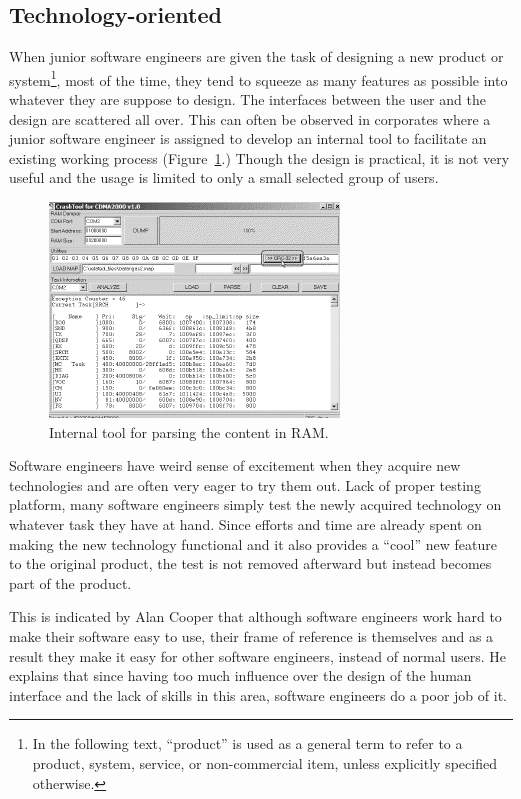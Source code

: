 \documentclass{acm_proc_article-sp}
\begin{document}
\subsection{Technology-oriented}
When junior software engineers are given the task of designing a new
product or system\footnote{In the following text, ``product'' is used
  as a general term to refer to a product, system, service, or
  non-commercial item, unless explicitly specified otherwise.}, most
of the time, they tend to squeeze as many features as possible into
whatever they are suppose to design. The interfaces between the user
and the design are scattered all over. This can often be observed in
corporates where a junior software engineer is assigned to develop an
internal tool to facilitate an existing working process
(Figure~\ref{fig:featureful}.)  Though the design is practical, it is
not very useful and the usage is limited to only a small selected
group of users.

\begin{figure}[!t]
\centering
\includegraphics[width=.7\columnwidth]{featureful}
\caption{Internal tool for parsing the content in RAM.}
\label{fig:featureful}
\end{figure}

Software engineers have weird sense of excitement when they acquire
new technologies and are often very eager to try them out. Lack of
proper testing platform, many software engineers simply test the newly
acquired technology on whatever task they have at hand. Since efforts
and time are already spent on making the new technology functional and
it also provides a ``cool'' new feature to the original product, the
test is not removed afterward but instead becomes part of the product.

This is indicated by Alan Cooper \citeyearpar{inmates:cooper} that
although software engineers work hard to make their software easy to
use, their frame of reference is themselves and as a result they make
it easy for other software engineers, instead of normal users. He
explains that since having too much influence over the design of the
human interface and the lack of skills in this area, software
engineers do a poor job of it.
\end{document}
